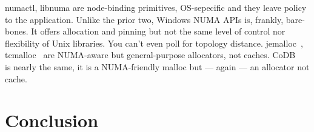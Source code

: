 \documentclass[sigplan,10pt]{acmart}
\begin{document}
numactl, libnuma are node-binding primitives, OS-sepecific and they leave policy to the application.
Unlike the prior two, Windows NUMA APIs is, frankly, bare-bones. 
It offers allocation and pinning but not the same level of control nor flexibility of Unix libraries. You can't even poll for topology distance.
jemalloc~\cite{jemalloc}, tcmalloc~\cite{tcmalloc} are NUMA-aware but general-purpose allocators, not caches.
CoDB ~\cite{numaeffects} is nearly the same, it is a NUMA-friendly malloc but --- again --- an allocator not cache.
%
%
%

\section{Conclusion}
\label{sec:conclusion}

%



\end{document}

